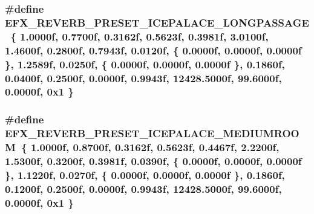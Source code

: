 \subsubsection[{\texorpdfstring{E\+F\+X\+\_\+\+R\+E\+V\+E\+R\+B\+\_\+\+P\+R\+E\+S\+E\+T\+\_\+\+I\+C\+E\+P\+A\+L\+A\+C\+E\+\_\+\+L\+O\+N\+G\+P\+A\+S\+S\+A\+GE}{EFX_REVERB_PRESET_ICEPALACE_LONGPASSAGE}}]{\setlength{\rightskip}{0pt plus 5cm}\#define E\+F\+X\+\_\+\+R\+E\+V\+E\+R\+B\+\_\+\+P\+R\+E\+S\+E\+T\+\_\+\+I\+C\+E\+P\+A\+L\+A\+C\+E\+\_\+\+L\+O\+N\+G\+P\+A\+S\+S\+A\+GE~\{ 1.\+0000f, 0.\+7700f, 0.\+3162f, 0.\+5623f, 0.\+3981f, 3.\+0100f, 1.\+4600f, 0.\+2800f, 0.\+7943f, 0.\+0120f, \{ 0.\+0000f, 0.\+0000f, 0.\+0000f \}, 1.\+2589f, 0.\+0250f, \{ 0.\+0000f, 0.\+0000f, 0.\+0000f \}, 0.\+1860f, 0.\+0400f, 0.\+2500f, 0.\+0000f, 0.\+9943f, 12428.\+5000f, 99.\+6000f, 0.\+0000f, 0x1 \}}\hypertarget{efx-presets_8h_aeea083a21bc57d1d7ecc3563b6286209}{}\label{efx-presets_8h_aeea083a21bc57d1d7ecc3563b6286209}
\subsubsection[{\texorpdfstring{E\+F\+X\+\_\+\+R\+E\+V\+E\+R\+B\+\_\+\+P\+R\+E\+S\+E\+T\+\_\+\+I\+C\+E\+P\+A\+L\+A\+C\+E\+\_\+\+M\+E\+D\+I\+U\+M\+R\+O\+OM}{EFX_REVERB_PRESET_ICEPALACE_MEDIUMROOM}}]{\setlength{\rightskip}{0pt plus 5cm}\#define E\+F\+X\+\_\+\+R\+E\+V\+E\+R\+B\+\_\+\+P\+R\+E\+S\+E\+T\+\_\+\+I\+C\+E\+P\+A\+L\+A\+C\+E\+\_\+\+M\+E\+D\+I\+U\+M\+R\+O\+OM~\{ 1.\+0000f, 0.\+8700f, 0.\+3162f, 0.\+5623f, 0.\+4467f, 2.\+2200f, 1.\+5300f, 0.\+3200f, 0.\+3981f, 0.\+0390f, \{ 0.\+0000f, 0.\+0000f, 0.\+0000f \}, 1.\+1220f, 0.\+0270f, \{ 0.\+0000f, 0.\+0000f, 0.\+0000f \}, 0.\+1860f, 0.\+1200f, 0.\+2500f, 0.\+0000f, 0.\+9943f, 12428.\+5000f, 99.\+6000f, 0.\+0000f, 0x1 \}}\hypertarget{efx-presets_8h_adcfa8da52e8876bda4b3598de6434f01}{}\label{efx-presets_8h_adcfa8da52e8876bda4b3598de6434f01}
